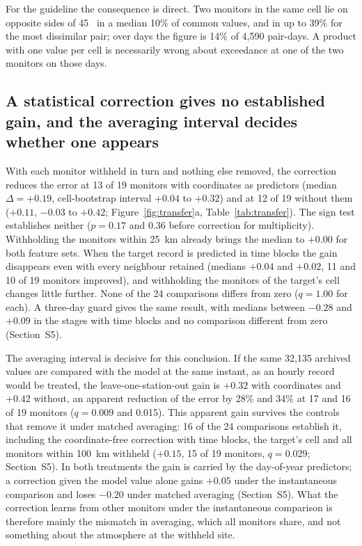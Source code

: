 For the guideline the consequence is direct. Two monitors in the same cell lie on opposite sides
of 45~\ugm{} in a median 10\% of common values, and in up to 39\% for the most dissimilar pair;
over days the figure is 14\% of 4,590 pair-days. A product with one value per cell is necessarily
wrong about exceedance at one of the two monitors on those days.

\subsection{A statistical correction gives no established gain, and the averaging interval
decides whether one appears}
\label{sec:res-transfer}

With each monitor withheld in turn and nothing else removed, the correction reduces the error at
13 of 19 monitors with coordinates as predictors (median $\Delta=+0.19$, cell-bootstrap interval
$+0.04$ to $+0.32$) and at 12 of 19 without them ($+0.11$, $-0.03$ to $+0.42$;
Figure~\ref{fig:transfer}a, Table~\ref{tab:transfer}). The sign test establishes neither
($p=0.17$ and 0.36 before correction for multiplicity). Withholding the monitors within 25~km
already brings the median to $+0.00$ for both feature sets. When the target record is predicted
in time blocks the gain disappears even with every neighbour retained (medians $+0.04$ and
$+0.02$, 11 and 10 of 19 monitors improved), and withholding the monitors of the target's cell
changes little further. None of the 24 comparisons differs from zero ($q=1.00$ for each). A
three-day guard gives the same result, with medians between $-0.28$ and $+0.09$ in the stages
with time blocks and no comparison different from zero (Section~S5).

The averaging interval is decisive for this conclusion. If the same 32,135 archived values are
compared with the model at the same instant, as an hourly record would be treated, the
leave-one-station-out gain is $+0.32$ with coordinates and $+0.42$ without, an apparent reduction
of the error by 28\% and 34\% at 17 and 16 of 19 monitors ($q=0.009$ and 0.015). This apparent
gain survives the controls that remove it under matched averaging: 16 of the 24 comparisons
establish it, including the coordinate-free correction with time blocks, the target's cell and
all monitors within 100~km withheld ($+0.15$, 15 of 19 monitors, $q=0.029$; Section~S5). In both
treatments the gain is carried by the day-of-year predictors; a correction given the model value
alone gains $+0.05$ under the instantaneous comparison and loses $-0.20$ under matched averaging
(Section~S5). What the correction learns from other monitors under the instantaneous comparison
is therefore mainly the mismatch in averaging, which all monitors share, and not something about
the atmosphere at the withheld site.

